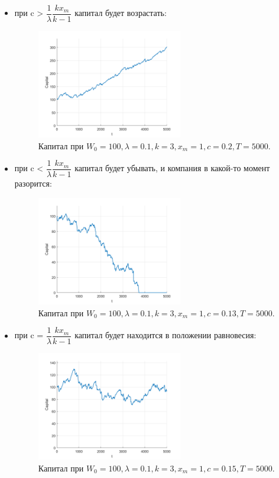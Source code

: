 \documentclass[oneside, final, 12pt]{article}
\begin{document}
	\begin{itemize}
		\item при c > $\dfrac{1}{\lambda}\dfrac{k x_m}{k-1}$ капитал будет возрастать:
			\begin{figure}[h!]
				\centering
				\includegraphics[width=0.6\textwidth]{../code/Task_11/pict/ins_10_100_20_3_ex.png}
				\caption{Капитал при $W_0 = 100, \lambda=  0.1, k=3, x_m =1, c =0.2, T=5000 $.}
		    \end{figure}
		\item при c < $\dfrac{1}{\lambda}\dfrac{k x_m}{k-1}$ капитал будет убывать, и компания в какой-то 
			момент разорится:
			\begin{figure}[h!]
				\centering
				\includegraphics[width=0.6\textwidth]{../code/Task_11/pict/ins_10_100_13_3_ex.png}
				\caption{Капитал при $W_0 = 100, \lambda=  0.1, k=3, x_m =1, c =0.13, T=5000 $.}
		    \end{figure}
		\newpage
		\item при c = $\dfrac{1}{\lambda}\dfrac{k x_m}{k-1}$ капитал будет находится в положении равновесия:
			\begin{figure}[h!]
				\centering
				\includegraphics[width=0.6\textwidth]{../code/Task_11/pict/ins_10_100_15_3_ex.png}
				\caption{Капитал при $W_0 = 100, \lambda=  0.1, k=3, x_m =1, c =0.15, T=5000 $.}
		    \end{figure}
	\end{itemize}
\newpage
\end{document}
